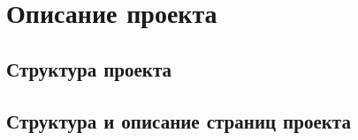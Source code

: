 \section{Описание проекта}
\subsection{Структура проекта}

\subsection{Структура и описание страниц проекта}
